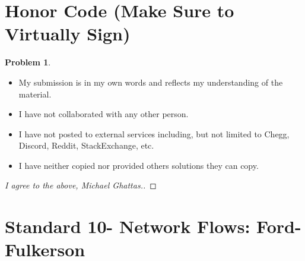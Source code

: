 \documentclass[11pt]{article}
\theoremstyle{definition}
\theoremstyle{definition}
\newtheorem{required}{Problem}
\theoremstyle{definition}
\begin{document}
\section{Honor Code (Make Sure to Virtually Sign)} \label{HonorCode}

\begin{required}
\noindent 
\begin{itemize}
\item My submission is in my own words and reflects my understanding of the material.
\item I have not collaborated with any other person.
\item I have not posted to external services including, but not limited to Chegg, Discord, Reddit, StackExchange, etc.
\item I have neither copied nor provided others solutions they can copy.
\end{itemize}

\end{required}

\begin{proof}[I agree to the above, Michael Ghattas.]
\end{proof}

\newpage
\section{Standard 10- Network Flows: Ford-Fulkerson}
\end{document}

